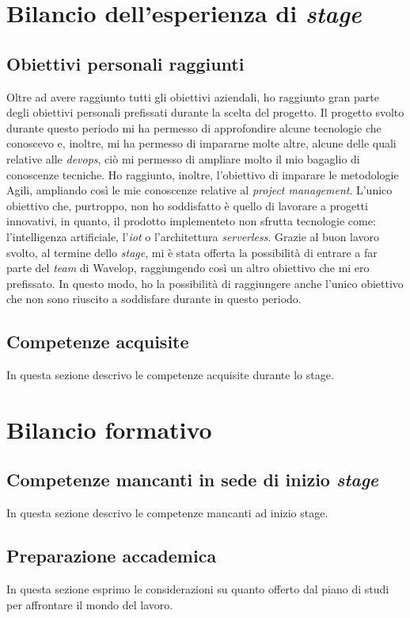 \section{Bilancio dell'esperienza di \emph{stage}}

\subsection{Obiettivi personali raggiunti}
Oltre ad avere raggiunto tutti gli obiettivi aziendali, ho raggiunto gran parte degli obiettivi personali prefissati durante la scelta del progetto.
Il progetto svolto durante questo periodo mi ha permesso di approfondire alcune tecnologie che conoscevo e, inoltre, mi ha permesso di impararne molte altre, alcune delle quali relative alle \emph{devops}, ciò mi permesso di ampliare molto il mio bagaglio di conoscenze tecniche. 
Ho raggiunto, inoltre, l'obiettivo di imparare le metodologie Agili, ampliando così le mie conoscenze relative al \emph{project management}.
L'unico obiettivo che, purtroppo, non ho soddisfatto è quello di lavorare a progetti innovativi, in quanto, il prodotto implementeto non sfrutta tecnologie come: l'intelligenza artificiale, l'\emph{\acrlong{iot}} o l'architettura \emph{serverless}.
Grazie al buon lavoro svolto, al termine dello \emph{stage}, mi è stata offerta la possibilità di entrare a far parte del \emph{team} di Wavelop, raggiungendo così un altro obiettivo che mi ero prefissato.
In questo modo, ho la possibilità di raggiungere anche l'unico obiettivo che non sono riuscito a soddisfare durante in questo periodo.

\subsection{Competenze acquisite}
In questa sezione descrivo le competenze acquisite durante lo stage.

\section{Bilancio formativo}

\subsection{Competenze mancanti in sede di inizio \emph{stage}}
In questa sezione descrivo le competenze mancanti ad inizio stage.

\subsection{Preparazione accademica}
In questa sezione esprimo le considerazioni su quanto offerto dal piano di studi per affrontare il mondo del lavoro.